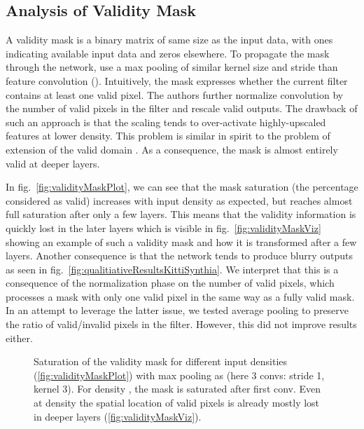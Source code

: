 \documentclass[10pt,twocolumn,letterpaper]{article}
\begin{document}
\subsection{Analysis of Validity Mask}
\label{sec:validity-mask}

A validity mask \cite{uhrig2017sparsity,luo2016understanding} is a binary matrix of same size as the input data, with ones indicating available input data and zeros elsewhere.
To propagate the mask through the network, \cite{uhrig2017sparsity} use a max pooling of similar kernel size  and stride  than feature convolution (). Intuitively, the mask expresses whether the current filter contains at least one valid pixel. The authors further normalize convolution by the number of valid pixels in the filter and rescale valid outputs. 
The drawback of such an approach is that the scaling tends to over-activate highly-upscaled features at lower density.
This problem is similar in spirit to the problem of extension of the valid domain \cite{graham2017submanifold}.
As a consequence, the mask is almost entirely valid at deeper layers.

In fig.~\ref{fig:validityMaskPlot}, we can see
that the mask saturation (the percentage considered as valid) increases with input density as expected, but reaches almost full saturation after only a few layers.
This means that the validity information is quickly lost in the later layers which is visible in fig.~\ref{fig:validityMaskViz} showing an example of such a validity mask and how it is transformed after a few layers.
Another consequence is that the network tends to produce
blurry outputs as seen in fig.~\ref{fig:qualitiativeResultsKittiSynthia}. We interpret that this is a consequence of the normalization phase on the number of valid pixels, which
processes a mask with only one valid pixel in the same way as a fully valid mask. In an attempt to leverage the latter issue, we tested average pooling to preserve the ratio of
valid/invalid pixels in the filter. However, this did not improve results either.

\begin{figure}
	\centering
	\hspace{.01\linewidth}
	\caption{Saturation of the validity mask for different input densities (\ref{fig:validityMaskPlot}) with max pooling as \cite{uhrig2017sparsity} (here 3 convs: stride 1, kernel 3). For density , the mask is saturated after first conv. Even at  density the spatial location of valid pixels is already mostly lost in deeper layers (\ref{fig:validityMaskViz}).}
	\label{fig:validityMask}
\end{figure}
\end{document}

